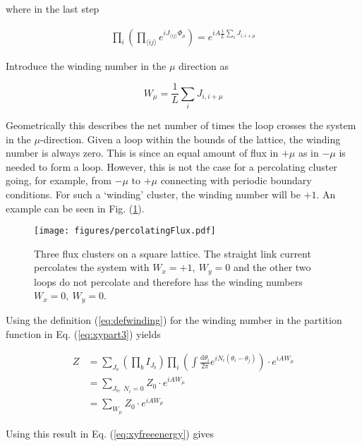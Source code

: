 \newpage

\noindent where in the last step

\begin{align}
    \prod_i \left (\prod_{\langle ij \rangle} e^{i J_{\langle ij \rangle} \Phi_\mu} \right) = e^{iA \frac{1}{L} \sum_i J_{i, i+\mu}}   
\end{align}

Introduce the winding number in the $\mu$ direction as

\begin{equation}
    W_\mu = \frac{1}{L} \sum_i J_{i, i+\mu}
\label{eq:defwinding}
\end{equation}

Geometrically this describes the net number of times the loop crosses the system in the $\mu$-direction. Given a loop within the bounds of the lattice, the winding number is always zero. This is since an equal amount of flux in $+\mu$ as in $-\mu$ is needed to form a loop. However, this is not the case for a percolating cluster going, for example, from $-\mu$ to $+\mu$ connecting with periodic boundary conditions. For such a `winding' cluster, the winding number will be $+1$. An example can be seen in Fig. (\ref{fig:fluxpercolation}).

\begin{figure}[h!]
    \centering
        \texttt{[image: figures/percolatingFlux.pdf]}
    \caption{Three flux clusters on a square lattice. The straight link current percolates the system with $W_x = +1, \ W_y = 0$ and the other two loops do not percolate and therefore has the winding numbers $W_x = 0, \ W_y = 0$.}
    \label{fig:fluxpercolation}
\end{figure}


\newpage

Using the definition (\ref{eq:defwinding}) for the winding number in the partition function in Eq. (\ref{eq:xypart3}) yields

\begin{align}
    Z &= \sum_{J_b} \left ( \prod_b I_{J_b} \right ) \prod_i \left ( \int \frac{\mathrm d \theta_i}{2 \pi} e^{i N_i (\theta_i - \theta_j)} \right ) \cdot e^{i A W_\mu} \\
    &= \sum_{J_b, \ N_i = 0} Z_0 \cdot e^{i A W_\mu} \\
    &= \sum_{W_\mu} Z_0 \cdot e^{i A W_\mu}
\end{align}

Using this result in Eq. (\ref{eq:xyfreeenergy}) gives

